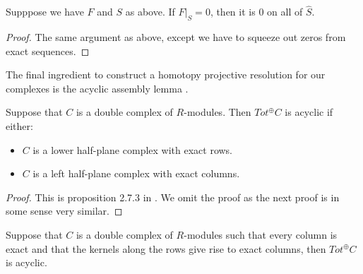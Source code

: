 \documentclass[../thesis.tex]{subfiles}
\begin{document}
            \begin{lemma}
                Supppose we have $F$ and $S$ as above. If $F|_S = 0$, then it is $0$ on all of $\widehat{S}$.
            \end{lemma}

            \begin{proof}
                The same argument as above, except we have to squeeze out zeros from exact sequences.
            \end{proof}

            The final ingredient to construct a homotopy projective resolution for our complexes is the acyclic assembly lemma \cite{Weibel94}.

            \begin{lemma}
                Suppose that $C$ is a double complex of $R$-modules. Then $Tot^\oplus C$ is acyclic if either:
                \begin{itemize}
                    \item $C$ is a lower half-plane complex with exact rows.
                    \item $C$ is a left half-plane complex with exact columns.
                \end{itemize}
            \end{lemma}

            \begin{proof}
                This is proposition 2.7.3 in \cite{Weibel94}. We omit the proof as the next proof is in some sense very similar.
            \end{proof}

            \begin{corollary}\label{cor: ac-as-2}
                Suppose that $C$ is a double complex of $R$-modules such that every column is exact and that the kernels along the rows give rise to exact columns, then $Tot^\oplus C$ is acyclic.
            \end{corollary}
\end{document}
